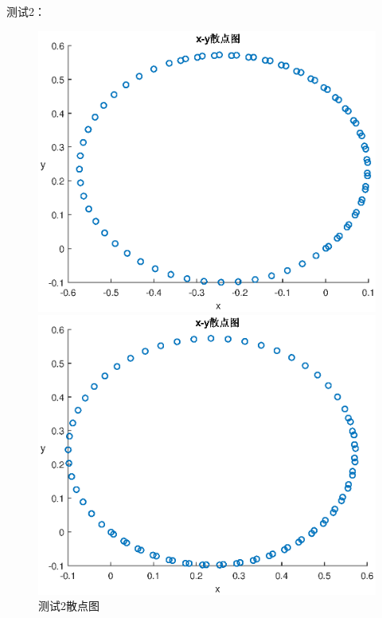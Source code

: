 \documentclass[withoutpreface,bwprint]{cumcmthesis}
\begin{document}
测试2：
\begin{figure}[!h]  
\centering  
\begin{minipage}{.5\textwidth}  
  \centering  
  \includegraphics[width=.9\linewidth]{k2+45.eps}  
\end{minipage}%
\begin{minipage}{.5\textwidth}  
  \centering  
  \includegraphics[width=.9\linewidth]{k2_san.eps}  
\end{minipage}  
\caption{测试2散点图}  
\end{figure}  
\end{document}
